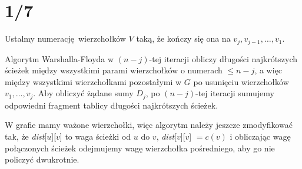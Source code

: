 \documentclass[a4paper, 12pt]{article}
\newcommand{\+}{\enspace}
\begin{document}
\section*{1/7}
Ustalmy numerację wierzchołków $V$ taką, że kończy się ona na
$v_j, v_{j-1}, …, v_1$.

Algorytm Warshalla-Floyda w ${(n-j)}$-tej iteracji obliczy długości
najkrótszych ścieżek między wszystkimi parami wierzchołków o numerach $≤ n-j$,
a więc między wszystkimi wierzchołkami pozostałymi w $G$ po usunięciu
wierzchołków $v_1, …, v_j$.
Aby obliczyć żądane sumy $D_j$,
po ${(n-j)}$-tej iteracji sumujemy odpowiedni fragment
tablicy długości najkrótszych ścieżek.

W grafie mamy ważone wierzchołki, więc algorytm należy jeszcze zmodyfikować tak,
że \textit{dist}[$u$][$v$] to waga ścieżki od $u$ do $v$,
\textit{dist}[$v$][$v$] $= c(v)$ i obliczając wagę połączonych ścieżek
odejmujemy wagę wierzchołka pośredniego, aby go nie policzyć dwukrotnie.
\end{document}
